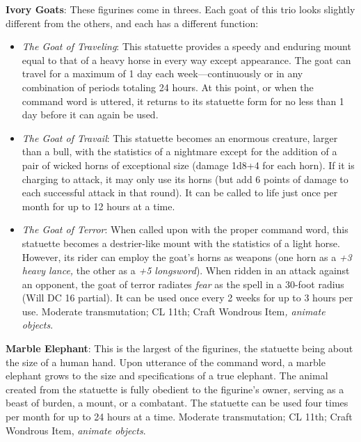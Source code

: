 \textbf{Ivory Goats}: These figurines come in threes. Each goat of this trio looks slightly different from the others, and each has a different function:
				\begin{itemize}\item  \textit{The Goat of Traveling}: This statuette provides a speedy and enduring mount equal to that of a heavy horse in every way except appearance. The goat can travel for a maximum of 1 day each week---continuously or in any combination of periods totaling 24 hours. At this point, or when the command word is uttered, it returns to its statuette form for no less than 1 day before it can again be used.
				\item  \textit{The Goat of Travail}: This statuette becomes an enormous creature, larger than a bull, with the statistics of a nightmare except for the addition of a pair of wicked horns of exceptional size (damage 1d8+4 for each horn). If it is charging to attack, it may only use its horns (but add 6 points of damage to each successful attack in that round). It can be called to life just once per month for up to 12 hours at a time.
				\item  \textit{The Goat of Terror}: When called upon with the proper command word, this statuette becomes a destrier-like mount with the statistics of a light horse. However, its rider can employ the goat's horns as weapons (one horn as a \textit{+3 heavy lance,} the other as a \textit{+5 longsword}). When ridden in an attack against an opponent, the goat of terror radiates \textit{fear} as the spell in a 30-foot radius (Will DC 16 partial). It can be used once every 2 weeks for up to 3 hours per use. Moderate transmutation; CL 11th; Craft Wondrous Item\textit{, animate objects}.
\end{itemize}
				
\textbf{Marble Elephant}: This is the largest of the figurines, the statuette being about the size of a human hand. Upon utterance of the command word, a marble elephant grows to the size and specifications of a true elephant. The animal created from the statuette is fully obedient to the figurine's owner, serving as a beast of burden, a mount, or a combatant. The statuette can be used four times per month for up to 24 hours at a time. Moderate transmutation; CL 11th; Craft Wondrous Item,\textit{ animate objects}.
				
